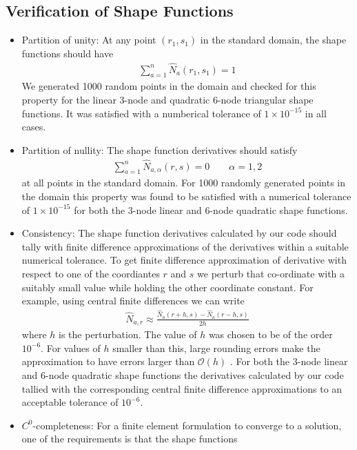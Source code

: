 \documentclass[../main.tex]{subfiles}
\begin{document}
\subsection{Verification of Shape Functions}
\begin{itemize}
\item Partition of unity: At any point $(r_1,s_1)$ in the standard
  domain, the shape functions should have
  \begin{align*}
    \sum_{a=1}^n\hat{N}_a(r_1,s_1) = 1
  \end{align*}
  We generated 1000 random points in the domain and checked for this
  property for the linear 3-node and quadratic 6-node triangular shape
  functions. It was satisfied with a numberical tolerance of
  $1\times10^{-15}$ in all cases.
\item Partition of nullity: The shape function derivatives should
  satisfy
  \begin{align*}
    \sum_{a=1}^n\hat{N}_{a,\alpha}(r,s) = 0\qquad\alpha=1,2
  \end{align*} at all points in the standard
  domain. For 1000 randomly generated points in the domain this
  property was found to be satisfied with a numerical tolerance of
  $1\times10^{-15}$ for both the 3-node linear and 6-node quadratic 
  shape functions.
\item Consistency: The shape function derivatives calculated by our
  code should tally with finite difference approximations of the
  derivatives within a suitable numerical tolerance. To get finite
  difference approximation of derivative with respect to one of the
  coordiantes $r$ and $s$ we perturb that co-ordinate with a suitably
  small value while holding the other coordinate constant. For
  example, using central finite differences we can write
  \begin{align*}
    \hat{N}_{a,r} \approx \frac{\hat{N}_{a}(r+h,s) - \hat{N}_{a}(r-h,s)}{2h}
  \end{align*}
  where $h$ is the perturbation. The value of $h$ was chosen to be of
  the order $10^{-6}$. For values of $h$ smaller than this, large
  rounding errors make the approximation to have errors larger than
  $\mathcal{O}(h)$ . For both the 3-node linear and 6-node quadratic
  shape functions the derivatives calculated by our code tallied with
  the corresponding central finite difference approximations to an
  acceptable tolerance of $10^{-6}$.
\item $C^0$-completeness: For a finite element formulation to converge
  to a solution, one of the requirements is that the shape functions

\end{itemize}
\end{document}
